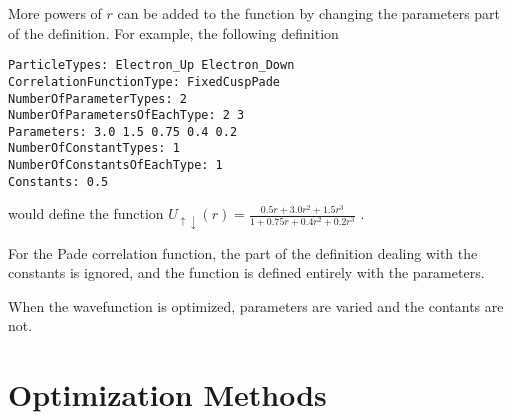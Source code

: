 \documentclass[11pt]{article}
\begin{document}
More powers of $r$ can be added to the function by changing the
parameters part of the definition.  For example, the following
definition
\begin{verbatim}
ParticleTypes: Electron_Up Electron_Down
CorrelationFunctionType: FixedCuspPade
NumberOfParameterTypes: 2
NumberOfParametersOfEachType: 2 3
Parameters: 3.0 1.5 0.75 0.4 0.2
NumberOfConstantTypes: 1
NumberOfConstantsOfEachType: 1
Constants: 0.5
\end{verbatim}
would define the function 
\(
U_{\uparrow \downarrow}(r)
=\frac{0.5r+3.0r^{2}+1.5r^{3}}{1+0.75r+0.4r^{2}+0.2r^{3}}
\)
.  

For the Pade correlation function, the part of the definition dealing
with the constants is ignored, and the function is defined entirely
with the parameters.

When the wavefunction is optimized, parameters are varied and the
contants are not.  

\section{Optimization Methods}

\renewcommand{\baselinestretch}{1.0} \small

\end{document}
